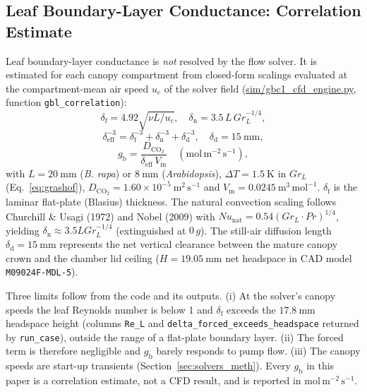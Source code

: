 \documentclass[pdflatex,sn-nature,iicol]{sn-jnl}
\begin{document}
\subsection{Leaf Boundary-Layer Conductance: Correlation Estimate}\label{sec:churchill_meth}

Leaf boundary-layer conductance is \emph{not} resolved by the flow solver. It is estimated for each canopy compartment from closed-form scalings evaluated at the compartment-mean air speed $u_c$ of the solver field (\url{sim/gbc1_cfd_engine.py}, function \texttt{gbl\_correlation}):
\begin{equation}
\delta_{\mathrm{f}} = 4.92\sqrt{\nu L / u_c}, \quad
\delta_{\mathrm{n}} = 3.5\, L\, Gr_L^{-1/4},
\label{eq:churchill}
\end{equation}
\begin{equation}
\delta_{\mathrm{eff}}^{-3} = \delta_{\mathrm{f}}^{-3} + \delta_{\mathrm{n}}^{-3} + \delta_{\mathrm{d}}^{-3}, \quad \delta_{\mathrm{d}} = 15\ \mathrm{mm},
\label{eq:blend}
\end{equation}
\begin{equation}
g_{\mathrm{b}} = \frac{D_{\mathrm{CO_2}}}{\delta_{\mathrm{eff}}\, V_{\mathrm{m}}}\quad (\mathrm{mol\,m^{-2}\,s^{-1}}),
\label{eq:gb_calc}
\end{equation}
with $L = 20\ \mathrm{mm}$ (\textit{B. rapa}) or $8\ \mathrm{mm}$ (\textit{Arabidopsis}), $\Delta T = 1.5\ \mathrm{K}$ in $Gr_L$ (Eq.~\ref{eq:grashof}), $D_{\mathrm{CO_2}} = 1.60\times10^{-5}\ \mathrm{m^2\,s^{-1}}$ and $V_{\mathrm{m}} = 0.0245\ \mathrm{m^3\,mol^{-1}}$. $\delta_{\mathrm{f}}$ is the laminar flat-plate (Blasius) thickness. The natural convection scaling follows Churchill \& Usagi (1972) and Nobel (2009) with $Nu_{\mathrm{nat}} = 0.54 (Gr_L \cdot Pr)^{1/4}$, yielding $\delta_{\mathrm{n}} \approx 3.5 L Gr_L^{-1/4}$ (extinguished at $0\,g$). The still-air diffusion length $\delta_{\mathrm{d}} = 15\ \mathrm{mm}$ represents the net vertical clearance between the mature canopy crown and the chamber lid ceiling ($H = 19.05\ \mathrm{mm}$ net headspace in CAD model \texttt{M09024F-MDL-5}).

Three limits follow from the code and its outputs. (i) At the solver's canopy speeds the leaf Reynolds number is below 1 and $\delta_{\mathrm{f}}$ exceeds the $17.8\ \mathrm{mm}$ headspace height (columns \texttt{Re\_L} and \texttt{delta\_forced\_exceeds\_headspace} returned by \texttt{run\_case}), outside the range of a flat-plate boundary layer. (ii) The forced term is therefore negligible and $g_{\mathrm{b}}$ barely responds to pump flow. (iii) The canopy speeds are start-up transients (Section~\ref{sec:solvers_meth}). Every $g_{\mathrm{b}}$ in this paper is a correlation estimate, not a CFD result, and is reported in $\mathrm{mol\,m^{-2}\,s^{-1}}$.
\end{document}
